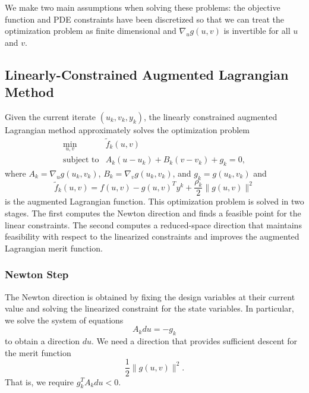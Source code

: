 \documentclass[]{book}
\begin{document}
We make two main assumptions when solving these problems: the 
objective function and PDE constraints 
have been discretized so that we can treat the optimization problem 
as finite dimensional and $\nabla_u g(u,v)$ is invertible for all 
$u$ and $v$.

\subsection{Linearly-Constrained Augmented Lagrangian Method}
Given the current iterate $(u_k, v_k, y_k)$, the linearly constrained
augmented Lagrangian method approximately solves the optimization 
problem
\[
\begin{array}{ll}
\displaystyle \min_{u,v} & \tilde{f}_k(u, v) \\
\mbox{subject to} & A_k (u-u_k) + B_k (v-v_k) + g_k = 0,
\end{array}
\]
where $A_k = \nabla_u g(u_k,v_k)$, $B_k = \nabla_v g(u_k,v_k)$, and
$g_k = g(u_k, v_k)$ and 
\[
\tilde{f}_k(u,v) = f(u,v) - g(u,v)^T y^k + \frac{\rho_k}{2} \| g(u,v) \|^2
\]
is the augmented Lagrangian function.  This optimization problem is
solved in two stages.  The first computes the Newton direction and
finds a feasible point for the linear constraints.  The second 
computes a reduced-space direction that maintains feasibility
with respect to the linearized constraints and improves the
augmented Lagrangian merit function.

\subsubsection{Newton Step}

The Newton direction is obtained by fixing the design variables at
their current value and solving the linearized constraint for the
state variables.  In particular, we solve the system of equations
\[
A_k du = -g_k
\]
to obtain a direction $du$.  We need a direction that provides
sufficient descent for the merit function
\[
  \frac{1}{2} \|g(u,v)\|^2.
\]
That is, we require $g_k^T A_k du < 0$.  
\end{document}
